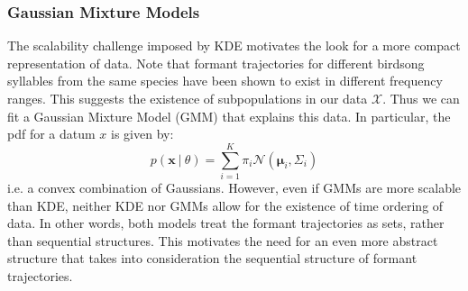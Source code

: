\documentclass[pdftex,11pt,a4paper]{article}
\theoremstyle{definition}
\theoremstyle{remark}
\newcommand*{\V}[1]{\mathbf{#1}}%
\newcommand\given[1][]{\:#1\vert\:}
\begin{document}
\subsubsection{Gaussian Mixture Models}
\label{subsection_gmm}
The scalability challenge imposed by KDE motivates the look for a more compact representation of data. Note that formant trajectories for different birdsong syllables from the same species have been shown to exist in different frequency ranges. This suggests the existence of subpopulations in our data $\mathcal{X}$. Thus we can fit a Gaussian Mixture Model (GMM) that explains this data. In particular, the pdf for a datum $x$ is given by:
\begin{equation} \label{eq:mixmod}
p(\V{x} \given \theta ) = \sum_{i=1}^K\pi_i \mathcal{N}(\V{\mu}_i, \Sigma_i) 
\end{equation}
i.e. a convex combination of Gaussians. However, even if GMMs are more scalable than KDE, neither KDE nor GMMs allow for the existence of time ordering of data. In other words, both models treat the formant trajectories as sets, rather than sequential structures. This motivates the need for an even more abstract structure that takes into consideration the sequential structure of formant trajectories.
\end{document}
